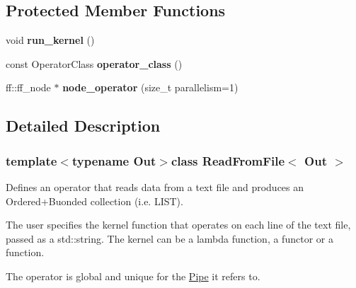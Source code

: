\subsection*{\-Protected \-Member \-Functions}
\begin{DoxyCompactItemize}
\item 
\hypertarget{class_read_from_file_af1d716032c6d0b662aba9318584b14ff}{void {\bfseries run\-\_\-kernel} ()}\label{class_read_from_file_af1d716032c6d0b662aba9318584b14ff}

\item 
\hypertarget{class_read_from_file_a1cb0beec0a2db61f86dea66931373726}{const \-Operator\-Class {\bfseries operator\-\_\-class} ()}\label{class_read_from_file_a1cb0beec0a2db61f86dea66931373726}

\item 
\hypertarget{class_read_from_file_ad7a8bb09472bbf84575a7e60fcc3bb6d}{ff\-::ff\-\_\-node $\ast$ {\bfseries node\-\_\-operator} (size\-\_\-t parallelism=1)}\label{class_read_from_file_ad7a8bb09472bbf84575a7e60fcc3bb6d}

\end{DoxyCompactItemize}


\subsection{\-Detailed \-Description}
\subsubsection*{template$<$typename Out$>$class Read\-From\-File$<$ Out $>$}

\-Defines an operator that reads data from a text file and produces an \-Ordered+\-Buonded collection (i.\-e. \-L\-I\-S\-T).

\-The user specifies the kernel function that operates on each line of the text file, passed as a std\-::string. \-The kernel can be a lambda function, a functor or a function.

\-The operator is global and unique for the \hyperlink{class_pipe}{\-Pipe} it refers to. 

